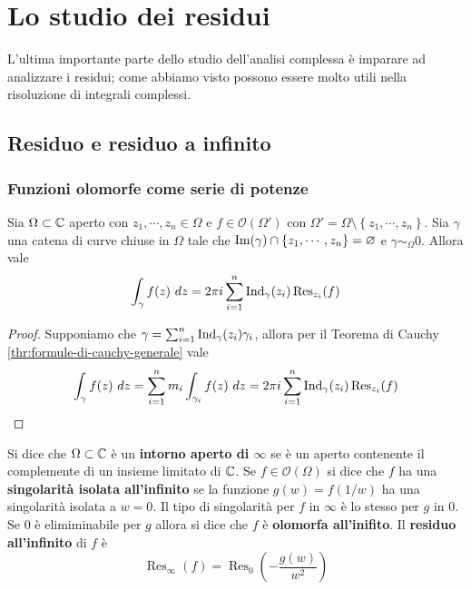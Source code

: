 \def \Res {\operatorname{Res}}

\chapter{Lo studio dei residui}
L'ultima importante parte dello studio dell'analisi complessa è imparare ad analizzare i residui; come abbiamo visto possono essere molto utili nella risoluzione di integrali complessi.

\newpage
\section{Residuo e residuo a infinito}
\subsection{\textcolor{AnComp}{\textbf{Funzioni olomorfe come serie di potenze}}}
\begin{theorem}
  Sia $\Omega \subset \mathbb{C}$ aperto con $z_1, \cdots, z_n \in \Omega$ e $f \in
  \mathcal{O}(\Omega')$ con $\Omega' = \Omega \setminus \left\{ z_1,\cdots, z_n
  \right\}$. Sia $\gamma$ una catena di curve chiuse in $\Omega$ tale che
  $\operatorname{Im}(\gamma) \cap \left\{ z_1, \cdots,z_n \right\} = \varnothing$ e $\gamma
  \sim_\Omega 0$. Allora vale 
  \begin{equation*}
    \int_\gamma f(z)\ dz = 2 \pi i \sum_{i=1}^{n} \Ind_\gamma(z_i)
    \Res_{z_i}(f)
  \end{equation*}
  \label{thr:teorema_dei_residui}
\end{theorem}
\begin{proof}
  Supponiamo che $\gamma = \sum_{i=1}^n \operatorname{Ind}_\gamma (z_i) \gamma_i$, allora
  per il Teorema di Cauchy \ref{thr:formule-di-cauchy-generale} vale 
  \begin{equation*}
    \int_\gamma f(z) \ dz = \sum_{i = 1}^{n} m_i \int_{\gamma_i} f(z) \ dz
    = 2 \pi i \sum_{i=1}^n \Ind_\gamma(z_i) \Res_{z_i}(f)
  \end{equation*}
\end{proof}

\begin{definition}
  Si dice che $\Omega \subset \mathbb{C}$ è un \textbf{intorno aperto di $\infty$} se
  è un aperto contenente il complemente di un insieme limitato di $\mathbb{C}$. Se $f
  \in \mathcal{O}(\Omega)$ si dice che $f$ ha una \textbf{singolarità isolata
  all'infinito} se la funzione $g(w) = f(1/w)$ ha una singolarità isolata a $w
  = 0$. Il tipo di singolarità per $f$ in $\infty$ è lo stesso per $g$ in $0$.
  Se $0$ è elimiminabile per $g$ allora si dice che $f$ è \textbf{olomorfa
  all'inifito}. Il \textbf{residuo all'infinito} di $f$ è 
  \begin{equation*}
    \Res_\infty(f) = \Res_0\left( -\frac{g(w)}{w^2} \right)
  \end{equation*}
  \label{def:varie_definizioni_all'inifinito}
\end{definition}

